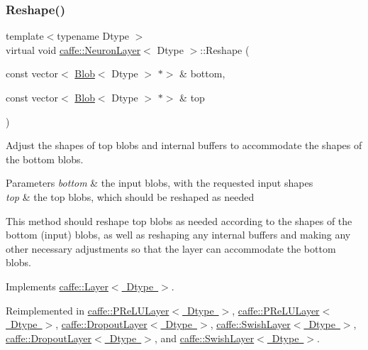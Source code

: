 \subsubsection{\texorpdfstring{Reshape()}{Reshape()}\hspace{0.1cm}{\footnotesize\ttfamily [1/2]}}
{\footnotesize\ttfamily template$<$typename Dtype $>$ \\
virtual void \mbox{\hyperlink{classcaffe_1_1_neuron_layer}{caffe\+::\+Neuron\+Layer}}$<$ Dtype $>$\+::Reshape (\begin{DoxyParamCaption}\item[{const vector$<$ \mbox{\hyperlink{classcaffe_1_1_blob}{Blob}}$<$ Dtype $>$ $\ast$$>$ \&}]{bottom,  }\item[{const vector$<$ \mbox{\hyperlink{classcaffe_1_1_blob}{Blob}}$<$ Dtype $>$ $\ast$$>$ \&}]{top }\end{DoxyParamCaption})\hspace{0.3cm}{\ttfamily [virtual]}}



Adjust the shapes of top blobs and internal buffers to accommodate the shapes of the bottom blobs. 


\begin{DoxyParams}{Parameters}
{\em bottom} & the input blobs, with the requested input shapes \\
\hline
{\em top} & the top blobs, which should be reshaped as needed\\
\hline
\end{DoxyParams}
This method should reshape top blobs as needed according to the shapes of the bottom (input) blobs, as well as reshaping any internal buffers and making any other necessary adjustments so that the layer can accommodate the bottom blobs. 

Implements \mbox{\hyperlink{classcaffe_1_1_layer_a7fe981e8af8d93d587acf2a952be563d}{caffe\+::\+Layer$<$ Dtype $>$}}.



Reimplemented in \mbox{\hyperlink{classcaffe_1_1_p_re_l_u_layer_a50ad2070e060093556d1fc12f31e33b1}{caffe\+::\+P\+Re\+L\+U\+Layer$<$ Dtype $>$}}, \mbox{\hyperlink{classcaffe_1_1_p_re_l_u_layer_a923c7c14b470ff84a9b8ee4a93395b5d}{caffe\+::\+P\+Re\+L\+U\+Layer$<$ Dtype $>$}}, \mbox{\hyperlink{classcaffe_1_1_dropout_layer_a8ddbd583b7430f228506954910935505}{caffe\+::\+Dropout\+Layer$<$ Dtype $>$}}, \mbox{\hyperlink{classcaffe_1_1_swish_layer_a995afbac7e3adc0bfe157b0458656a9e}{caffe\+::\+Swish\+Layer$<$ Dtype $>$}}, \mbox{\hyperlink{classcaffe_1_1_dropout_layer_a93f66d83b510987fe37a42d14e6ff98a}{caffe\+::\+Dropout\+Layer$<$ Dtype $>$}}, and \mbox{\hyperlink{classcaffe_1_1_swish_layer_aecf840a1202549b60742eb11a2f188ee}{caffe\+::\+Swish\+Layer$<$ Dtype $>$}}.

